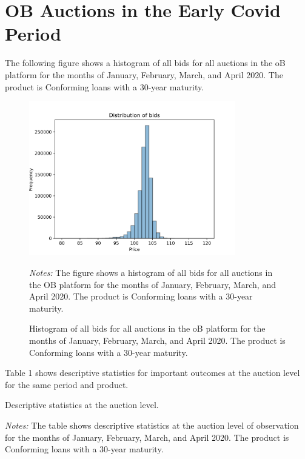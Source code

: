 \documentclass[11pt,a4paper]{article}
\begin{document}
\pagebreak
\section{OB Auctions in the Early Covid Period}

The following figure shows a histogram of all bids for all auctions in the oB platform for the months of January, February, March, and April 2020. The product is Conforming loans with a 30-year maturity. 


\begin{figure}[h]
    \centering
    \includegraphics[width=0.8\textwidth]{../results/figures/distribution_of_bids.png}
    \caption{Histogram of all bids for all auctions in the oB platform for the months of January, February, March, and April 2020. The product is Conforming loans with a 30-year maturity.}
    \begin{minipage}{\textwidth}
        \footnotesize{\textit{Notes:} The figure shows a histogram of all bids for all auctions in the OB platform for the months of January, February, March, and April 2020. The product is Conforming loans with a 30-year maturity. } 
        \end{minipage}
\end{figure}


Table 1 shows descriptive statistics for important outcomes at the auction level for the same period and product. 


\begin{table}[h]
    \centering
    
    \caption{Descriptive statistics at the auction level. }
    \begin{minipage}{\textwidth}
        \footnotesize{\textit{Notes:} The table shows descriptive statistics at the auction level of observation for the months of January, February, March, and April 2020. The product is Conforming loans with a 30-year maturity. } 
        \end{minipage}
\end{table}
\end{document}
